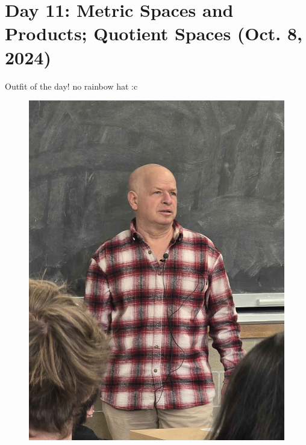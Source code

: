 \section{Day 11: Metric Spaces and Products; Quotient Spaces (Oct. 8, 2024)}
Outfit of the day! no rainbow hat :c
\begin{figure}[h]
    \centering
    \includegraphics[scale=0.1]{MAT327 Notes/Dror Shirts/dror day 12 shirt.jpg}
\end{figure}

